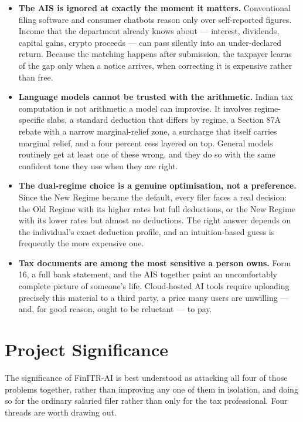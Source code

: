 \documentclass[12pt, a4paper, oneside]{report}
\begin{document}
\begin{itemize}
    \item \textbf{The AIS is ignored at exactly the moment it matters.}
          Conventional filing software and consumer chatbots reason only over
          self-reported figures. Income that the department already knows about
          --- interest, dividends, capital gains, crypto proceeds --- can pass
          silently into an under-declared return. Because the matching happens
          after submission, the taxpayer learns of the gap only when a notice
          arrives, when correcting it is expensive rather than free.
    \item \textbf{Language models cannot be trusted with the arithmetic.}
          Indian tax computation is not arithmetic a model can improvise. It
          involves regime-specific slabs, a standard deduction that differs by
          regime, a Section 87A rebate with a narrow marginal-relief zone, a
          surcharge that itself carries marginal relief, and a four percent cess
          layered on top. General models routinely get at least one of these
          wrong, and they do so with the same confident tone they use when they
          are right.
    \item \textbf{The dual-regime choice is a genuine optimisation, not a
          preference.} Since the New Regime became the default, every filer faces
          a real decision: the Old Regime with its higher rates but full
          deductions, or the New Regime with its lower rates but almost no
          deductions. The right answer depends on the individual's exact
          deduction profile, and an intuition-based guess is frequently the more
          expensive one.
    \item \textbf{Tax documents are among the most sensitive a person owns.}
          Form 16, a full bank statement, and the AIS together paint an
          uncomfortably complete picture of someone's life. Cloud-hosted AI tools
          require uploading precisely this material to a third party, a price
          many users are unwilling --- and, for good reason, ought to be
          reluctant --- to pay.
\end{itemize}

\section{Project Significance}
\label{sec:project-significance}

The significance of FinITR-AI is best understood as attacking all four of those
problems together, rather than improving any one of them in isolation, and doing
so for the ordinary salaried filer rather than only for the tax professional.
Four threads are worth drawing out.
\end{document}
